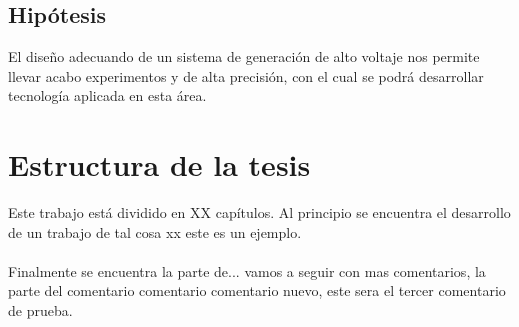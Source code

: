 \subsection{Hipótesis}
El diseño adecuando de un sistema de generación de alto voltaje nos permite llevar acabo experimentos y de alta precisión, con el cual se podrá desarrollar tecnología aplicada en esta área.


\section{Estructura de la tesis}

Este trabajo está dividido en XX capítulos. Al principio se encuentra el desarrollo de un trabajo de tal cosa xx este es un ejemplo.
\\\\
Finalmente se encuentra la parte de... vamos a seguir con mas comentarios, la parte del comentario comentario comentario nuevo, este sera el tercer comentario de prueba.